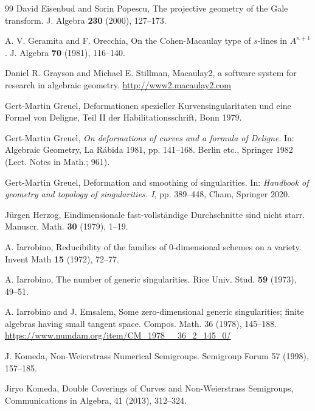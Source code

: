 \documentclass{amsart}
\theoremstyle{definition}
\theoremstyle{remark}
\begin{document}
\begin{thebibliography}{99}
David Eisenbud and Sorin Popescu, 
The projective geometry of the Gale transform.
J. Algebra {\bf 230} (2000),  127--173.

A. V. Geramita and F. Orecchia,
On the {Cohen}-{Macaulay} type of $s$-lines in $A^{n+1}$.
J. Algebra {\bf70} (1981), 116--140.


Daniel R. Grayson and  Michael E. Stillman,
Macaulay2, a software system for research in algebraic geometry.
 \url{http://www2.macaulay2.com}


Gert-Martin Greuel, 
Deformationen spezieller Kurvensingularitaten
und eine Formel von Deligne, Teil II der Habilitationsschrift,
Bonn 1979.

  Gert-Martin Greuel, 
  {\sl On deformations of curves and a formula of De\-ligne\/}. 
  In: Algebraic Geometry, La R\'abida 1981, pp. 141--168.
  Berlin etc., Springer 1982 (Lect. Notes in Math.; 961).
  
  Gert-Martin Greuel, 
  Deformation and smoothing of singularities. In: 
  {\it Handbook of geometry and topology of singularities. I}, pp. 389--448, Cham, Springer 2020.

Jürgen Herzog,
Eindimensionale fast-vollst{\"a}ndige {Durchschnitte} sind nicht starr.
Manuscr. Math. {\bf30} (1979), 1--19.

A. Iarrobino, 
Reducibility of the families of 0-dimensional schemes on a variety. 
Invent Math {\bf15} (1972), 72--77. 

A. Iarrobino,
The number of generic singularities. 
 Rice Univ. Stud. {\bf 59} (1973),  49--51.


A. Iarrobino and J. Emsalem, 
Some zero-dimensional generic singularities; finite algebras having small tangent space.
Compos. Math. 36 (1978), 145--188.\\
\url{https://www.numdam.org/item/CM_1978__36_2_145_0/}

J. Komeda, Non-Weierstrass Numerical Semigroups.
Semigroup Forum 57 (1998), 157--185. \\

Jiryo Komeda,
 Double Coverings of Curves and Non-Weierstrass
Semigroups, Communications in Algebra, 41 (2013), 312--324.


\end{thebibliography}
\end{document}
